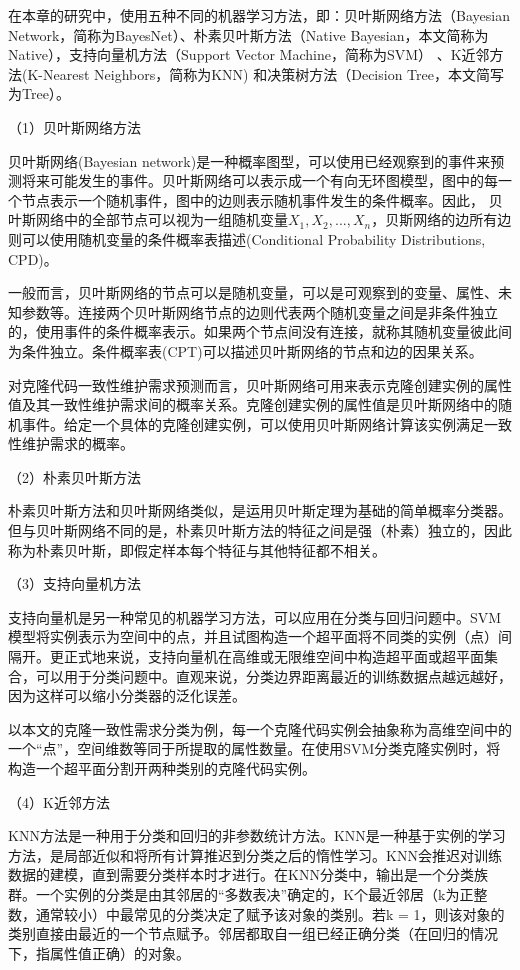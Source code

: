 在本章的研究中，使用五种不同的机器学习方法，即：贝叶斯网络方法（Bayesian Network，简称为BayesNet）\cite{friedman1997bayesian}、朴素贝叶斯方法（Native Bayesian，本文简称为Native）\cite{john1995estimating}，支持向量机方法（Support Vector Machine，简称为SVM）\cite{platt199912} 、K近邻方法(K-Nearest Neighbors，简称为KNN) \cite{aha1991instance}和决策树方法（Decision Tree，本文简写为Tree）\cite{quinlan2014c4}。

（1）贝叶斯网络方法

贝叶斯网络(Bayesian network)是一种概率图型，可以使用已经观察到的事件来预测将来可能发生的事件\cite{friedman1997bayesian}。贝叶斯网络可以表示成一个有向无环图模型，图中的每一个节点表示一个随机事件，图中的边则表示随机事件发生的条件概率。因此， 贝叶斯网络中的全部节点可以视为一组随机变量{$X_{1},X_{2},...,X_{n}$}，贝斯网络的边所有边则可以使用随机变量的条件概率表描述(Conditional Probability Distributions, CPD)。

一般而言，贝叶斯网络的节点可以是随机变量，可以是可观察到的变量、属性、未知参数等。连接两个贝叶斯网络节点的边则代表两个随机变量之间是非条件独立的，使用事件的条件概率表示。如果两个节点间没有连接，就称其随机变量彼此间为条件独立。条件概率表(CPT)可以描述贝叶斯网络的节点和边的因果关系。

对克隆代码一致性维护需求预测而言，贝叶斯网络可用来表示克隆创建实例的属性值及其一致性维护需求间的概率关系。克隆创建实例的属性值是贝叶斯网络中的随机事件。给定一个具体的克隆创建实例，可以使用贝叶斯网络计算该实例满足一致性维护需求的概率。

（2）朴素贝叶斯方法

朴素贝叶斯方法和贝叶斯网络类似，是运用贝叶斯定理为基础的简单概率分类器。但与贝叶斯网络不同的是，朴素贝叶斯方法的特征之间是强（朴素）独立的，因此称为朴素贝叶斯，即假定样本每个特征与其他特征都不相关。 

（3）支持向量机方法

支持向量机是另一种常见的机器学习方法，可以应用在分类与回归问题中。SVM模型将实例表示为空间中的点，并且试图构造一个超平面将不同类的实例（点）间隔开。更正式地来说，支持向量机在高维或无限维空间中构造超平面或超平面集合，可以用于分类问题中。直观来说，分类边界距离最近的训练数据点越远越好，因为这样可以缩小分类器的泛化误差。

以本文的克隆一致性需求分类为例，每一个克隆代码实例会抽象称为高维空间中的一个“点”，空间维数等同于所提取的属性数量。在使用SVM分类克隆实例时，将构造一个超平面分割开两种类别的克隆代码实例。

（4）K近邻方法

KNN方法是一种用于分类和回归的非参数统计方法。KNN是一种基于实例的学习方法，是局部近似和将所有计算推迟到分类之后的惰性学习。KNN会推迟对训练数据的建模，直到需要分类样本时才进行。在KNN分类中，输出是一个分类族群。一个实例的分类是由其邻居的“多数表决”确定的，K个最近邻居（k为正整数，通常较小）中最常见的分类决定了赋予该对象的类别。若k = 1，则该对象的类别直接由最近的一个节点赋予。邻居都取自一组已经正确分类（在回归的情况下，指属性值正确）的对象。

